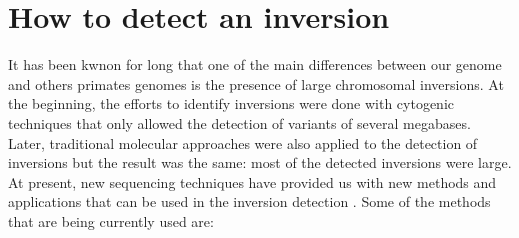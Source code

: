 \documentclass[a4paper,12pt]{article}
\begin{document}
\section{How to detect an inversion}
It has been kwnon for long that one of the main differences between our genome and others primates genomes is the presence of large chromosomal inversions. At the beginning, the efforts to identify inversions were done with cytogenic techniques that only allowed the detection of variants of several megabases. Later, traditional molecular approaches were also applied to the detection of inversions but the result was the same: most of the detected inversions were large. At present, new sequencing techniques have provided us with new methods and applications that can be used in the inversion detection \cite{puig_human_2015}. 
Some of the methods that are being currently used are:
\end{document}
